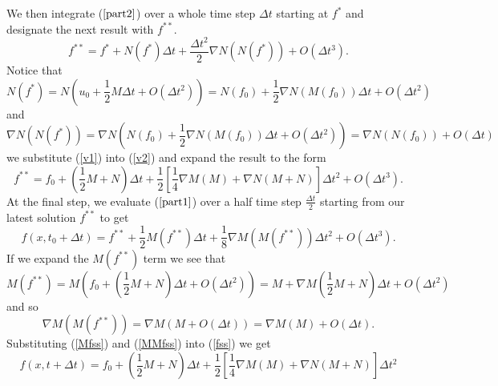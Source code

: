 %
We then integrate ($\ref{part2}$) over a whole time step $\Delta t$ starting at $f^*$ and designate the next result with $f^{**}$.
%
\begin{equation}
\label{v2}
f^{**} = f^* + N(f^*) \Delta t + \frac{\Delta t^2}{2} \nabla N(N(f^*)) + O(\Delta t^3).
\end{equation}
%
Notice that
%
\begin{equation}
\label{Nv1}
N(f^*) = N \left(u_0 + \frac{1}{2} M \Delta t + O(\Delta t^2)\right) = N(f_0) + \frac{1}{2} \nabla N(M(f_0)) \Delta t + O(\Delta t^2)
\end{equation}
%
and
%
\begin{equation}
\label{NNv1}
\nabla N\left(N(f^*)\right) = \nabla N \left(N(f_0) + \frac{1}{2} \nabla N(M(f_0)) \Delta t + O(\Delta t^2) \right) = \nabla N\left(N(f_0)\right) + O(\Delta t)
\end{equation}
%
we substitute (\ref{v1}) into (\ref{v2}) and expand the result to the form
%
\begin{equation}
f^{**} = f_0 + \left(\frac{1}{2} M + N \right) \Delta t + \frac{1}{2} \left[ \frac{1}{4} \nabla M\left(M \right) + \nabla N\left(M+N \right)\right] \Delta t^2 + O(\Delta t^3).
\end{equation}
%
At the final step, we evaluate ($\ref{part1}$) over a half time step $\frac{\Delta t}{2}$ starting from our latest solution $f^{**}$ to get
%
\begin{equation}
\label{fss}
f(x,t_0+\Delta t) = f^{**} + \frac{1}{2} M(f^{**}) \Delta t + \frac{1}{8} \nabla M \left( M(f^{**}) \right) \Delta t^2 + O(\Delta t^3).
\end{equation}
%
If we expand the $M(f^{**})$ term we see that
%
\begin{equation}
\label{Mfss}
M(f^{**}) = M\left(f_0 + \left(\frac{1}{2}M + N \right) \Delta t + O(\Delta t^2)\right) = M + \nabla M(\frac{1}{2} M + N) \Delta t + O(\Delta t^2)
\end{equation}
%
and so
%
\begin{equation}
\label{MMfss}
\nabla M \left(M(f^{**})\right) = \nabla M\left(M + O(\Delta t)\right) = \nabla M\left(M \right) + O(\Delta t).
\end{equation}
%
Substituting (\ref{Mfss}) and (\ref{MMfss}) into (\ref{fss}) we get
%
\begin{equation*}
f(x,t+\Delta t) = f_0 + \left(\frac{1}{2} M + N \right) \Delta t + \frac{1}{2} \left[ \frac{1}{4} \nabla M \left(M \right) + \nabla N\left (M + N \right) \right] \Delta t^2
\end{equation*}

